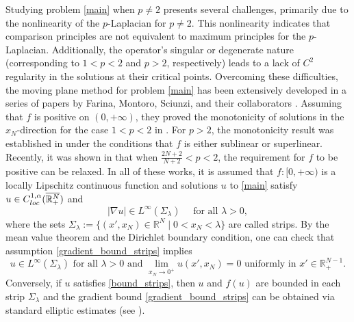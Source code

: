 \documentclass[reqno]{amsart}
\theoremstyle{plain}
\theoremstyle{definition}
\theoremstyle{remark}
\begin{document}
	Studying problem \eqref{main} when \( p \neq 2 \) presents several challenges, primarily due to the nonlinearity of the \( p \)-Laplacian for \( p \neq 2 \). This nonlinearity indicates that comparison principles are not equivalent to maximum principles for the \( p \)-Laplacian. Additionally, the operator's singular or degenerate nature (corresponding to \( 1 < p < 2 \) and \( p > 2 \), respectively) leads to a lack of \( C^2 \) regularity in the solutions at their critical points. Overcoming these difficulties, the moving plane method for problem \eqref{main} has been extensively developed in a series of papers by Farina, Montoro, Sciunzi, and their collaborators \cite{MR3303939,MR2886112,MR4439897,MR3752525,MR3118616}. Assuming that \( f \) is positive on \((0,+\infty)\), they proved the monotonicity of solutions in the \( x_N \)-direction for the case \( 1 < p < 2 \) in \cite{MR3303939,MR2886112}. For \( p > 2 \), the monotonicity result was established in \cite{MR3752525,MR3118616} under the conditions that \( f \) is either sublinear or superlinear. Recently, it was shown in \cite{MR4439897} that when \( \frac{2N+2}{N+2}<p<2 \), the requirement for \( f \) to be positive can be relaxed.
	In all of these works, it is assumed that \( f:[0,+\infty) \) is a locally Lipschitz continuous function and solutions $u$ to \eqref{main} satisfy $u \in C^{1,\alpha}_{\rm loc}(\overline{\mathbb{R}^N_+})$ and
	\begin{equation}\label{gradient_bound_strips}
		|\nabla u| \in L^\infty(\Sigma_\lambda) \quad\text{ for all } \lambda>0,
	\end{equation}
	where the sets $\Sigma_\lambda := \{(x',x_N)\in\mathbb{R}^N \mid 0<x_N<\lambda \}$ are called strips. By the mean value theorem and the Dirichlet boundary condition, one can check that assumption \eqref{gradient_bound_strips} implies
	\begin{equation}\label{bound_strips}
		u\in L^\infty(\Sigma_\lambda) \text{ for all } \lambda>0 \text{ and } \lim_{x_N\to0^+} u(x',x_N) = 0 \text{ uniformly in } x'\in\mathbb{R}^{N-1}_+.
	\end{equation}
	Conversely, if $u$ satisfies \eqref{bound_strips}, then $u$ and $f(u)$ are bounded in each strip $\Sigma_\lambda$ and the gradient bound \eqref{gradient_bound_strips} can be obtained via standard elliptic estimates (see \cite{MR709038,MR727034}).
	
\end{document}
